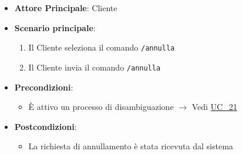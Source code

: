 \begin{itemize}
    \item \textbf{Attore Principale}: Cliente
	\item \textbf{Scenario principale}:
	\begin{enumerate}
		\item Il Cliente seleziona il comando \texttt{/annulla}
		\item Il Cliente invia il comando \texttt{/annulla}
	\end{enumerate}
	\item \textbf{Precondizioni}:
	\begin{itemize}
		\item È attivo un processo di disambiguazione $\rightarrow$ Vedi \hyperref[uc_21]{UC\_21}
	\end{itemize}
	\item \textbf{Postcondizioni}:
	\begin{itemize}
		\item La richiesta di annullamento è stata ricevuta dal sistema
	\end{itemize}
\end{itemize}